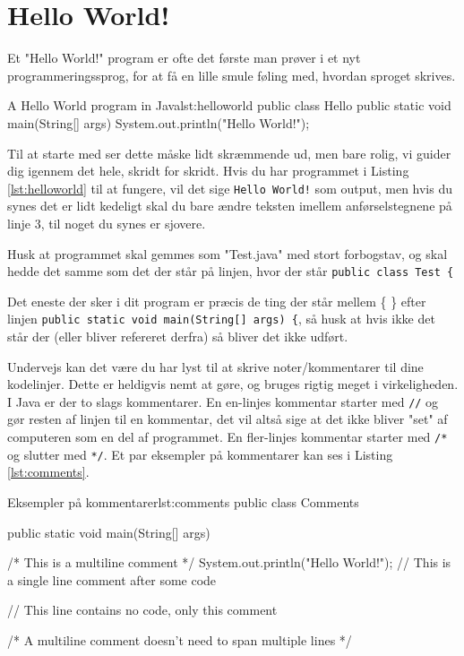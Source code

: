\section{Hello World!}
Et "Hello World!" program er ofte det første man prøver i et nyt programmeringssprog, for at få en lille smule føling med, hvordan sproget skrives.

\begin{JavaCode}{A Hello World program in Java}{lst:helloworld}
public class Hello {
	public static void main(String[] args) {
		System.out.println("Hello World!");
	}
}
\end{JavaCode}

Til at starte med ser dette måske lidt skræmmende ud, men bare rolig, vi guider dig igennem det hele, skridt for skridt. Hvis du har programmet i Listing \ref{lst:helloworld} til at fungere, vil det sige \texttt{Hello World!} som output, men hvis du synes det er lidt kedeligt skal du bare ændre teksten imellem anførselstegnene på linje 3, til noget du synes er sjovere.

\begin{remark}
	Husk at programmet skal gemmes som "Test.java" med stort forbogstav, og skal hedde det samme som det der står på linjen, hvor der står \texttt{public class Test \{}
\end{remark}

Det eneste der sker i dit program er præcis de ting der står mellem \{ \} efter linjen \texttt{public static void main(String[] args) \{}, så husk at hvis ikke det står der (eller bliver refereret derfra) så bliver det ikke udført.

\begin{remark}
	Undervejs kan det være du har lyst til at skrive noter/kommentarer til dine kodelinjer. Dette er heldigvis nemt at gøre, og bruges rigtig meget i virkeligheden. I Java er der to slags kommentarer. En en-linjes kommentar starter med \texttt{//} og gør resten af linjen til en kommentar, det vil altså sige at det ikke bliver "set" af computeren som en del af programmet. En fler-linjes kommentar starter med \texttt{/*} og slutter med \texttt{*/}. Et par eksempler på kommentarer kan ses i Listing \ref{lst:comments}.
\end{remark}

\begin{JavaCode}{Eksempler på kommentarer}{lst:comments}
public class Comments {
	public static void main(String[] args) {
		/*
		  This 
		  is
		  a 
		  multiline 
		  comment
		*/
		System.out.println("Hello World!");	// This is a single line comment after some code

		// This line contains no code, only this comment
		
		/* A multiline comment doesn't need to span multiple lines */
	}
}
\end{JavaCode}

